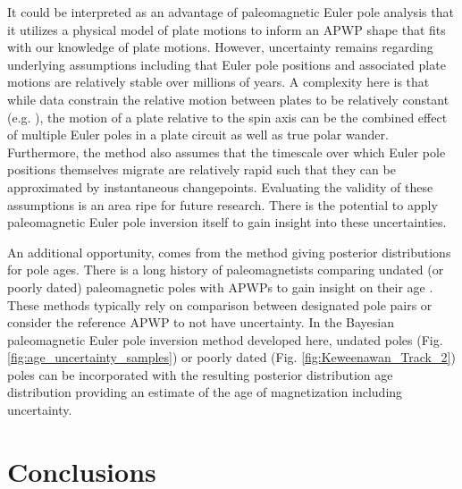 \documentclass[11pt,letterpaper]{article}
\begin{document}
It could be interpreted as an advantage of paleomagnetic Euler pole analysis that it utilizes a physical model of plate motions to inform an APWP shape that fits with our knowledge of plate motions. However, uncertainty remains regarding underlying assumptions including that Euler pole positions and associated plate motions are relatively stable over millions of years. A complexity here is that while data constrain the relative motion between plates to be relatively constant (e.g. \cite{Muller2016a}), the motion of a plate relative to the spin axis can be the combined effect of multiple Euler poles in a plate circuit as well as true polar wander. Furthermore, the method also assumes that the timescale over which Euler pole positions themselves migrate are relatively rapid such that they can be approximated by instantaneous changepoints. Evaluating the validity of these assumptions is an area ripe for future research. There is the potential to apply paleomagnetic Euler pole inversion itself to gain insight into these uncertainties.

An additional opportunity, comes from the method giving posterior distributions for pole ages. There is a long history of paleomagnetists comparing undated (or poorly dated) paleomagnetic poles with APWPs to gain insight on their age \citep{McCabe1984b, Hnatyshin2014a}. These methods typically rely on comparison between designated pole pairs or consider the reference APWP to not have uncertainty. In the Bayesian paleomagnetic Euler pole inversion method developed here, undated poles (Fig. \ref{fig:age_uncertainty_samples}) or poorly dated (Fig. \ref{fig:Keweenawan_Track_2}) poles can be incorporated with the resulting posterior distribution age distribution providing an estimate of the age of magnetization including uncertainty. 


\section*{Conclusions}
\label{sec:conclusions}
\end{document}
